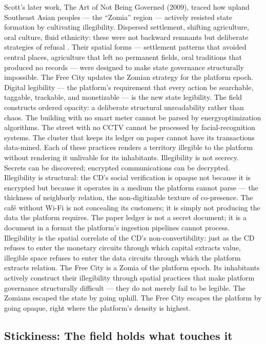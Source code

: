 Scott’s later work, The Art of Not Being Governed (2009), traced how upland Southeast Asian peoples — the “Zomia” region — actively resisted state formation by cultivating illegibility. Dispersed settlement, shifting agriculture, oral culture, fluid ethnicity: these were not backward remnants but deliberate strategies of refusal \cite[pp.~8--39]{scott_2009}. Their spatial forms — settlement patterns that avoided central places, agriculture that left no permanent fields, oral traditions that produced no records — were designed to make state governance structurally impossible. The Free City updates the Zomian strategy for the platform epoch. Digital legibility — the platform’s requirement that every action be searchable, taggable, trackable, and monetizable — is the new state legibility. The field constructs ordered opacity: a deliberate structural unreadability rather than chaos. The building with no smart meter cannot be parsed by energyoptimization algorithms. The street with no CCTV cannot be processed by facial-recognition systems. The cluster that keeps its ledger on paper cannot have its transactions data-mined. Each of these practices renders a territory illegible to the platform without rendering it unlivable for its inhabitants. Illegibility is not secrecy. Secrets can be discovered; encrypted communications can be decrypted. Illegibility is structural: the CD’s social verification is opaque not because it is encrypted but because it operates in a medium the platform cannot parse — the thickness of neighborly relation, the non-digitizable texture of co-presence. The café without Wi-Fi is not concealing its customers; it is simply not producing the data the platform requires. The paper ledger is not a secret document; it is a document in a format the platform’s ingestion pipelines cannot process. Illegibility is the spatial correlate of the CD’s non-convertibility: just as the CD refuses to enter the monetary circuits through which capital extracts value, illegible space refuses to enter the data circuits through which the platform extracts relation. The Free City is a Zomia of the platform epoch. Its inhabitants actively construct their illegibility through spatial practices that make platform governance structurally difficult — they do not merely fail to be legible. The Zomians escaped the state by going uphill. The Free City escapes the platform by going opaque, right where the platform’s density is highest.

\subsection{Stickiness: The field holds what touches it}

